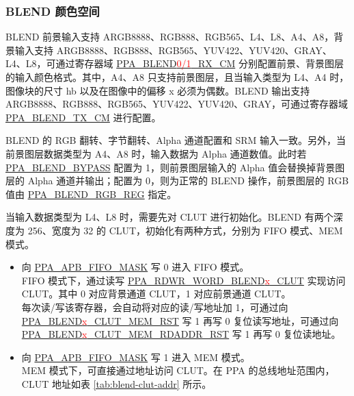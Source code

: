 \documentclass[main\_\_CN.tex]{subfiles}
\begin{document}
\subsubsection{BLEND 颜色空间}
\label{sec:blend-color-space}
BLEND 前景输入支持 ARGB8888、RGB888、RGB565、L4、L8、A4、A8，背景输入支持 ARGB8888、RGB888、RGB565、YUV422、YUV420、GRAY、L4、L8，可通过寄存器域 \hyperref[fielddesc:PPABLEND0RXCM]{PPA\_BLEND\textcolor{red}{0/1}\_RX\_CM} 分别配置前景、背景图层的输入颜色格式。其中，A4、A8 只支持前景图层，且当输入类型为 L4、A4 时，图像块的尺寸 hb 以及在图像中的偏移 x 必须为偶数。BLEND 输出支持 ARGB8888、RGB888、RGB565、YUV422、YUV420、GRAY，可通过寄存器域 \hyperref[fielddesc:PPABLENDTXCM]{PPA\_BLEND\_TX\_CM} 进行配置。

BLEND 的 RGB 翻转、字节翻转、Alpha 通道配置和 SRM 输入一致。另外，当前景图层数据类型为 A4、A8 时，输入数据为 Alpha 通道数值。此时若 \hyperref[fielddesc:PPABLENDBYPASS]{PPA\_BLEND\_BYPASS} 配置为 1，则前景图层输入的 Alpha 值会替换掉背景图层的 Alpha 通道并输出；配置为 0，则为正常的 BLEND 操作，前景图层的 RGB 值由 \hyperref[regdesc:PPABLENDRGBREG]{PPA\_BLEND\_RGB\_REG} 指定。

当输入数据类型为 L4、L8 时，需要先对 CLUT 进行初始化。BLEND 有两个深度为 256、宽度为 32 的 CLUT，初始化有两种方式，分别为 FIFO 模式、MEM 模式。

\begin{itemize}
    \item 向 \hyperref[fielddesc:PPAAPBFIFOMASK]{PPA\_APB\_FIFO\_MASK} 写 0 进入 FIFO 模式。\\
    FIFO 模式下，通过读写 \hyperref[fielddesc:PPARDWRWORDBLEND0CLUT]{PPA\_RDWR\_WORD\_BLEND\textcolor{red}{x}\_CLUT} 实现访问 CLUT。其中 0 对应背景通道 CLUT，1 对应前景通道 CLUT。\\
    每次读/写该寄存器，会自动将对应的读/写地址加 1，可通过向 \hyperref[fielddesc:PPABLEND0CLUTMEMRST]{PPA\_BLEND\textcolor{red}{x}\_CLUT\_MEM\_RST} 写 1 再写 0 复位读写地址，可通过向\hyperref[fielddesc:PPABLEND0CLUTMEMRDADDRRST]{PPA\_BLEND\textcolor{red}{x}\_CLUT\_MEM\_RDADDR\_RST} 写 1 再写 0 复位读地址。
    \item 向 \hyperref[fielddesc:PPAAPBFIFOMASK]{PPA\_APB\_FIFO\_MASK} 写 1 进入 MEM 模式。\\
    MEM 模式下，可直接通过地址访问 CLUT。在 PPA 的总线地址范围内，CLUT 地址如表 \ref{tab:blend-clut-addr} 所示。
\end{itemize}
\end{document}
